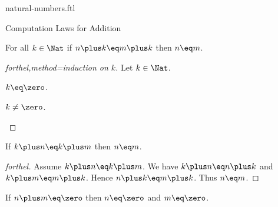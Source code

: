 \documentclass{naproche-library}
\begin{document}
\begin{smodule}[title=Natural Numbers]{natural-numbers.ftl}
\begin{sfragment}{Computation Laws for Addition}
  \begin{proposition}[forthel,title=Right cancellation,id=PlusIsRightCancellativeProp]
    For all $k\in\Nat$ if $n\plus k\eq m\plus k$ then $n\eq m$.
  \end{proposition}
  \begin{proof}[forthel,method=induction on $k$]
    Let $k\in\Nat$.

    \begin{case}{$k\eq\zero$.} \end{case}

    \begin{case}{$k\neq\zero$.} \end{case}
  \end{proof}

  \begin{corollary}[forthel,title=Left cancellation,id=PlusIsLeftCancellativeProp]
    If $k\plus n\eq k\plus m$ then $n\eq m$.
  \end{corollary}
  \begin{proof}[forthel]
    Assume $k\plus n\eq k\plus m$.
    We have $k\plus n\eq n\plus k$ and $k\plus m\eq m\plus k$.
    Hence $n\plus k\eq m\plus k$.
    Thus $n\eq m$.
  \end{proof}

  \begin{proposition}[forthel,id=ZeroSumImpliesZeroSummandsProp]
    If $n\plus m\eq\zero$ then $n\eq\zero$ and $m\eq\zero$.
  \end{proposition}
\end{sfragment}
\end{smodule}
\end{document}
